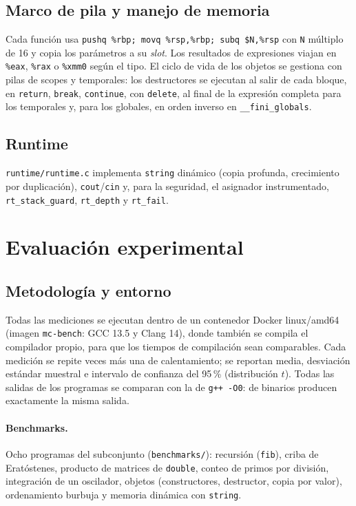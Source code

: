 \documentclass[11pt,a4paper]{article}
\newcommand{\cod}[1]{\texttt{#1}}
\begin{document}
\subsection{Marco de pila y manejo de memoria}
Cada función usa \cod{pushq \%rbp; movq \%rsp,\%rbp; subq \$N,\%rsp} con \cod{N} múltiplo de 16 y copia los parámetros a su
\emph{slot}. Los resultados de expresiones viajan en \cod{\%eax}, \cod{\%rax} o \cod{\%xmm0} según el tipo. El ciclo de vida
de los objetos se gestiona con pilas de scopes y temporales: los destructores se ejecutan al salir de cada bloque,
en \cod{return}, \cod{break}, \cod{continue}, con \cod{delete}, al final de la expresión completa para los temporales y,
para los globales, en orden inverso en \cod{\_\_fini\_globals}.

\subsection{Runtime}
\cod{runtime/runtime.c} implementa \cod{string} dinámico (copia profunda, crecimiento por duplicación), \cod{cout}/\cod{cin} y,
para la seguridad, el asignador instrumentado, \cod{rt\_stack\_guard}, \cod{rt\_depth} y \cod{rt\_fail}.

\section{Evaluación experimental}
\label{sec:eval}
\subsection{Metodología y entorno}
Todas las mediciones se ejecutan dentro de un contenedor Docker linux/amd64 (imagen \cod{mc-bench}: GCC 13.5 y
Clang 14), donde también se compila el compilador propio, para que los tiempos de compilación sean comparables.
Cada medición se repite \runsPorMedicion{} veces más una de calentamiento; se reportan media, desviación estándar
muestral e intervalo de confianza del 95\,\% (distribución $t$). Todas las salidas de los programas se comparan con
la de \cod{g++ -O0}: \fidelidadOk{} de \fidelidadTotal{} binarios producen exactamente la misma salida.

\begin{table}[H]
\centering\small

\caption{Entorno experimental.}
\end{table}

\paragraph{Benchmarks.} Ocho programas del subconjunto (\cod{benchmarks/}): recursión (\cod{fib}), criba de
Eratóstenes, producto de matrices de \cod{double}, conteo de primos por división, integración de un oscilador,
objetos (constructores, destructor, copia por valor), ordenamiento burbuja y memoria dinámica con \cod{string}.
\end{document}
